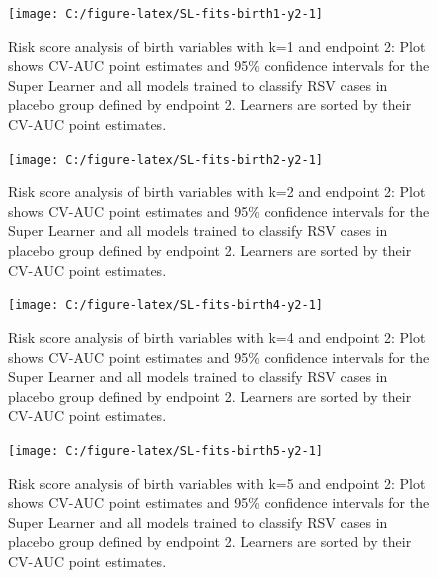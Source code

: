 \documentclass[11pt]{article}
\begin{document}
\clearpage

\begin{figure}[H]

{\centering \texttt{[image: C:/figure-latex/SL-fits-birth1-y2-1]} 

}

\caption[Risk score analysis of birth variables with k=1 and endpoint 2.]{Risk score analysis of birth variables with k=1 and endpoint 2: Plot shows CV-AUC point estimates and 95\% confidence intervals for the Super Learner and all models trained to classify RSV cases in placebo group defined by endpoint 2. Learners are sorted by their CV-AUC point estimates.}\label{fig:SL-fits-birth1-y2}
\end{figure}

\begin{figure}[H]

{\centering \texttt{[image: C:/figure-latex/SL-fits-birth2-y2-1]} 

}

\caption[Risk score analysis of birth variables with k=2 and endpoint 2.]{Risk score analysis of birth variables with k=2 and endpoint 2: Plot shows CV-AUC point estimates and 95\% confidence intervals for the Super Learner and all models trained to classify RSV cases in placebo group defined by endpoint 2. Learners are sorted by their CV-AUC point estimates.}\label{fig:SL-fits-birth2-y2}
\end{figure}

\begin{figure}[H]

{\centering \texttt{[image: C:/figure-latex/SL-fits-birth4-y2-1]} 

}

\caption[Risk score analysis of birth variables with k=4 and endpoint 2.]{Risk score analysis of birth variables with k=4 and endpoint 2: Plot shows CV-AUC point estimates and 95\% confidence intervals for the Super Learner and all models trained to classify RSV cases in placebo group defined by endpoint 2. Learners are sorted by their CV-AUC point estimates.}\label{fig:SL-fits-birth4-y2}
\end{figure}

\begin{figure}[H]

{\centering \texttt{[image: C:/figure-latex/SL-fits-birth5-y2-1]} 

}

\caption[Risk score analysis of birth variables with k=5 and endpoint 2.]{Risk score analysis of birth variables with k=5 and endpoint 2: Plot shows CV-AUC point estimates and 95\% confidence intervals for the Super Learner and all models trained to classify RSV cases in placebo group defined by endpoint 2. Learners are sorted by their CV-AUC point estimates.}\label{fig:SL-fits-birth5-y2}
\end{figure}
\end{document}
